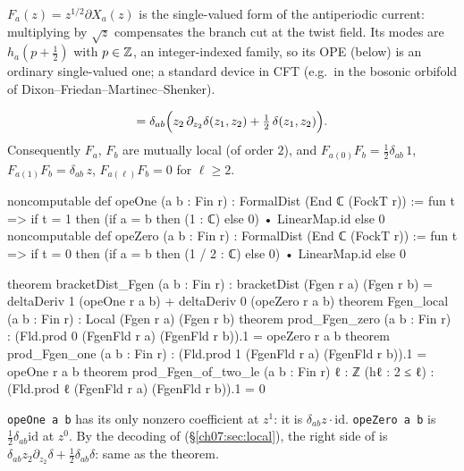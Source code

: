 \begin{physics}
$F_a(z)=z^{1/2}\partial X_a(z)$ is the single-valued form of the antiperiodic current: multiplying by $\sqrt z$ compensates the branch cut at the twist field. Its modes are $h_a(p+\tfrac12)$ with $p\in{\mathbb{Z}}$, an integer-indexed family, so its OPE (below) is an ordinary single-valued one; a standard device in CFT (e.g.\ in the bosonic orbifold of Dixon--Friedan--Martinec--Shenker).
\end{physics}

\begin{theorem}\label{ch07:thm:Fgencomm}
\begin{equation*}
  [F_a(z_1),F_b(z_2)] = \delta_{ab}\Bigl(z_2\,\partial_{z_2}\delta(z_1,z_2) +
  \tfrac12\,\delta(z_1,z_2)\Bigr).
\end{equation*}
Consequently $F_a$, $F_b$ are mutually local (of order $2$), and
$F_{a(0)}F_b = \tfrac12\delta_{ab}\,1$, $F_{a(1)}F_b = \delta_{ab}\,z$, $F_{a(\ell)}F_b = 0$ for
$\ell\ge2$.
\end{theorem}

\begin{leancode}
noncomputable def opeOne (a b : Fin r) : FormalDist (End ℂ (FockT r)) :=
  fun t => if t = 1 then (if a = b then (1 : ℂ) else 0) • LinearMap.id else 0
noncomputable def opeZero (a b : Fin r) : FormalDist (End ℂ (FockT r)) :=
  fun t => if t = 0 then (if a = b then (1 / 2 : ℂ) else 0) • LinearMap.id else 0

theorem bracketDist_Fgen (a b : Fin r) :
    bracketDist (Fgen r a) (Fgen r b)
      = deltaDeriv 1 (opeOne r a b) + deltaDeriv 0 (opeZero r a b)
theorem Fgen_local (a b : Fin r) : Local (Fgen r a) (Fgen r b)
theorem prod_Fgen_zero (a b : Fin r) :
    (Fld.prod 0 (FgenFld r a) (FgenFld r b)).1 = opeZero r a b
theorem prod_Fgen_one (a b : Fin r) :
    (Fld.prod 1 (FgenFld r a) (FgenFld r b)).1 = opeOne r a b
theorem prod_Fgen_of_two_le (a b : Fin r) {ℓ : ℤ} (hℓ : 2 ≤ ℓ) :
    (Fld.prod ℓ (FgenFld r a) (FgenFld r b)).1 = 0
\end{leancode}

\begin{dictionary}
\verb|opeOne a b| has its only nonzero coefficient at $z^1$: it is $\delta_{ab}z\cdot
\mathrm{id}$. \verb|opeZero a b| is $\frac12\delta_{ab}\mathrm{id}$ at $z^0$. By the decoding of
 (\S\ref{ch07:sec:local}), the right side of  is
$\delta_{ab}z_2\partial_{z_2}\delta + \frac12\delta_{ab}\delta$: same as the theorem.
\end{dictionary}

